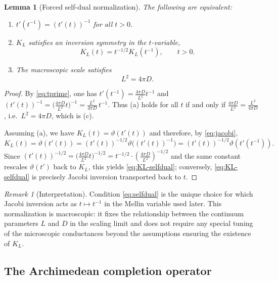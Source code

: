 \documentclass[11pt]{amsart}
\newtheorem{lemma}[theorem]{Lemma}
\theoremstyle{definition}
\theoremstyle{remark}
\newtheorem{remark}[theorem]{Remark}
\begin{document}
\begin{lemma}[Forced self-dual normalization]
\label{lem:forced-selfdual}
The following are equivalent:
\begin{enumerate}[label=(\alph*)]
\item $t'(t^{-1})=(t'(t))^{-1}$ for all $t>0$.
\item $K_L$ satisfies an inversion symmetry in the $t$-variable,
\begin{equation}\label{eq:KL-selfdual}
K_L(t)=t^{-1/2}K_L(t^{-1}),\qquad t>0.
\end{equation}
\item The macroscopic scale satisfies
\begin{equation}\label{eq:selfdual}
L^2=4\pi D.
\end{equation}
\end{enumerate}
\end{lemma}

\begin{proof}
By \eqref{eq:tprime}, one has $t'(t^{-1})=\frac{4\pi D}{L^2}t^{-1}$ and
$(t'(t))^{-1}=\bigl(\frac{4\pi D}{L^2}t\bigr)^{-1}=\frac{L^2}{4\pi D}\,t^{-1}$.
Thus (a) holds for all $t$ if and only if $\frac{4\pi D}{L^2}=\frac{L^2}{4\pi D}$,
i.e.\ $L^2=4\pi D$, which is (c).

Assuming (a), we have $K_L(t)=\vartheta(t'(t))$ and therefore, by \eqref{eq:jacobi},
\[
K_L(t)=\vartheta(t'(t))=(t'(t))^{-1/2}\vartheta\!\bigl((t'(t))^{-1}\bigr)
=(t'(t))^{-1/2}\vartheta(t'(t^{-1})).
\]
Since $(t'(t))^{-1/2}=\bigl(\frac{4\pi D}{L^2}t\bigr)^{-1/2}=t^{-1/2}\cdot(\frac{4\pi D}{L^2})^{-1/2}$
and the same constant rescales $\vartheta(t')$ back to $K_L$, this yields \eqref{eq:KL-selfdual};
conversely, \eqref{eq:KL-selfdual} is precisely Jacobi inversion transported back to $t$.
\end{proof}

\begin{remark}[Interpretation]
Condition \eqref{eq:selfdual} is the unique choice for which Jacobi inversion acts as
$t\mapsto t^{-1}$ in the Mellin variable used later.  This normalization is macroscopic: it fixes
the relationship between the continuum parameters $L$ and $D$ in the scaling limit and does not
require any special tuning of the microscopic conductances beyond the assumptions ensuring the
existence of $K_L$.
\end{remark}

\subsection{The Archimedean completion operator}
\end{document}
